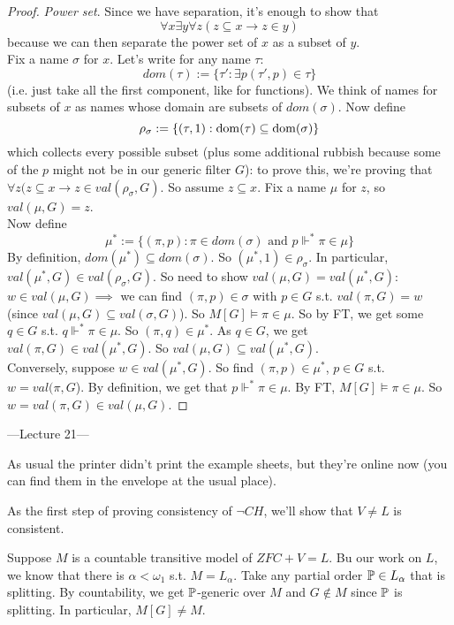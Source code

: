 \documentclass[a4paper]{article}
\begin{document}
\begin{proof}
\emph{Power set}. Since we have separation, it's enough to show that 
\[
\forall x \exists y \forall z (z \subseteq x \to z \in y)
\]
because we can then separate the power set of $x$ as a subset of $y$.\\
Fix a name $\sigma$ for $x$. Let's write for any name $\tau$:
\[
dom(\tau):=\{\tau': \exists p (\tau',p) \in \tau\}
\]
(i.e. just take all the first component, like for functions). We think of names for subsets of $x$ as names whose domain are subsets of $dom(\sigma)$. Now define
\[
\rho_\sigma:=\{(\tau,1): \dom(\tau) \subseteq \dom(\sigma)\}
\]
which collects every possible subset (plus some additional rubbish because some of the $p$ might not be in our generic filter $G$): to prove this, we're proving that $\forall z (z \subseteq x \to z \in val(\rho_\sigma,G)$. So assume $z \subseteq x$. Fix a name $\mu$ for $z$, so $val(\mu,G) = z$.\\
Now define
\[
\mu^* := \{(\pi,p):\pi \in dom(\sigma) \text{ and } p \Vdash^* \pi \in \mu\}
\]
By definition, $dom(\mu^*) \subseteq dom(\sigma)$. So $(\mu^*,1) \in \rho_\sigma$. In particular, $val(\mu^*,G) \in val(\rho_\sigma,G)$. So need to show $val(\mu,G) = val(\mu^*,G)$: $w \in val(\mu,G) \implies$ we can find $(\pi,p) \in \sigma$ with $p \in G$ s.t. $val(\pi,G) = w$ (since $val(\mu,G) \subseteq val(\sigma,G)$). So $M[G] \vDash \pi \in \mu$. So by FT, we get some $q \in G$ s.t. $q \Vdash^* \pi \in \mu$. So $(\pi,q) \in \mu^*$. As $q \in G$, we get $val(\pi,G) \in val(\mu^*,G)$. So $val(\mu,G) \subseteq val(\mu^*,G)$.\\
Conversely, suppose $w \in val(\mu^*,G)$. So find $(\pi,p) \in \mu^*$, $p \in G$ s.t. $w = val(\pi,G$). By definition, we get that $p \Vdash^* \pi \in \mu$. By FT, $M[G] \vDash \pi \in \mu$. So $w=val(\pi,G) \in val(\mu,G)$.
\end{proof}

---Lecture 21---

As usual the printer didn't print the example sheets, but they're online now (you can find them in the envelope at the usual place).

As the first step of proving consistency of $\neg CH$, we'll show that $V \neq L$ is consistent.

Suppose $M$ is a countable transitive model of $ZFC+V=L$. Bu our work on $L$, we know that there is $\alpha < \omega_1$ s.t. $M = L_\alpha$. Take any partial order $\P \in L_\alpha$ that is splitting. By countability, we get $\P$-generic over $M$ and $G \not\in M$ since $\P$ is splitting. In particular, $M[G] \neq M$.
\end{document}
